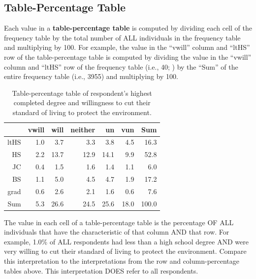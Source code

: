 \documentclass[10pt,openany]{book}\usepackage[]{graphicx}\usepackage[]{color}
\begin{document}

\vspace{-12pt}

\vspace{-12pt}
\subsection{Table-Percentage Table}
\vspace{-12pt}
Each value in a \textbf{table-percentage table} is computed by dividing each cell of the frequency table by the total number of ALL individuals in the frequency table and multiplying by 100.  For example, the value in the ``vwill'' column and ``ltHS'' row of the table-percentage table  is computed by dividing the value in the ``vwill'' column and ``ltHS'' row of the frequency table (i.e., 40; ) by the ``Sum'' of the entire frequency table (i.e., 3955) and multiplying by 100.

\begin{table}[ht]
\centering
\caption{Table-percentage table of respondent's highest completed degree and willingness to cut their standard of living to protect the environment.} 
\label{tab:EnvTblP}
\begin{tabular}{rrrrrrr}
  \hline
 & vwill & will & neither & un & vun & Sum \\ 
  \hline
ltHS & 1.0 & 3.7 & 3.3 & 3.8 & 4.5 & 16.3 \\ 
  HS & 2.2 & 13.7 & 12.9 & 14.1 & 9.9 & 52.8 \\ 
  JC & 0.4 & 1.5 & 1.6 & 1.4 & 1.1 & 6.0 \\ 
  BS & 1.1 & 5.0 & 4.5 & 4.7 & 1.9 & 17.2 \\ 
  grad & 0.6 & 2.6 & 2.1 & 1.6 & 0.6 & 7.6 \\ 
  Sum & 5.3 & 26.6 & 24.5 & 25.6 & 18.0 & 100.0 \\ 
   \hline
\end{tabular}
\end{table}


The value in each cell of a table-percentage table is the percentage OF ALL individuals that have the characteristic of that column AND that row.  For example, 1.0\% of ALL respondents had less than a high school degree AND were very willing to cut their standard of living to protect the environment.  Compare this interpretation to the interpretations from the row and column-percentage tables above.  This interpretation DOES refer to all respondents.
\end{document}
